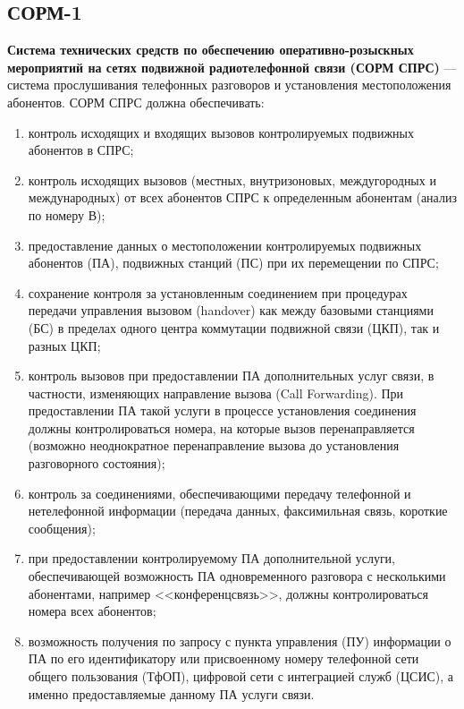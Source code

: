 {\subsection{СОРМ-1}
\textbf{Система технических средств по обеспечению оперативно-розыскных мероприятий на сетях подвижной радиотелефонной связи (СОРМ СПРС)} --- система прослушивания телефонных разговоров и установления местоположения абонентов.
СОРМ СПРС должна обеспечивать\cite{sorm_sorm1}:
\begin{enumerate}
\item контроль исходящих и входящих вызовов контролируемых подвижных абонентов в СПРС;
\item контроль исходящих вызовов (местных, внутризоновых, междугородных и международных) от всех абонентов СПРС к определенным абонентам (анализ по номеру В);
\item предоставление данных о местоположении контролируемых подвижных абонентов (ПА), подвижных станций (ПС) при их перемещении по СПРС;
\item сохранение контроля за установленным соединением при процедурах передачи управления вызовом (handover) как между базовыми станциями (БС) в пределах одного центра коммутации подвижной связи (ЦКП), так и разных ЦКП;
\item контроль вызовов при предоставлении ПА дополнительных услуг связи, в частности, изменяющих направление вызова (Call Forwarding). При предоставлении ПА такой услуги в процессе установления соединения должны контролироваться номера, на которые вызов перенаправляется (возможно неоднократное перенаправление вызова до установления разговорного состояния);
\item контроль за соединениями, обеспечивающими передачу телефонной и нетелефонной информации (передача данных, факсимильная связь, короткие сообщения);
\item при предоставлении контролируемому ПА дополнительной услуги, обеспечивающей возможность ПА одновременного разговора с несколькими абонентами, например <<конференцсвязь>>, должны контролироваться номера всех абонентов;
\item возможность получения по запросу с пункта управления (ПУ) информации о ПА по его идентификатору или присвоенному номеру телефонной сети общего пользования (ТфОП), цифровой сети с интеграцией служб (ЦСИС), а именно предоставляемые данному ПА услуги связи.
\end{enumerate}
}
